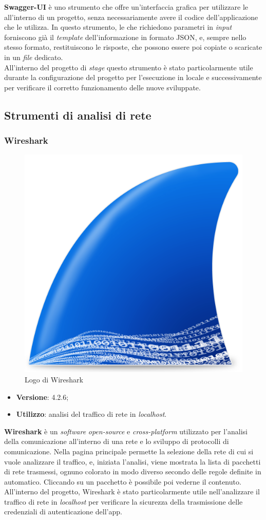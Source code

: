 \noindent \textbf{Swagger-UI} è uno strumento che offre un'interfaccia grafica per utilizzare le  all'interno di un progetto, senza necessariamente avere il codice dell'applicazione che le utilizza. In questo strumento, le  che richiedono parametri in \textit{input} forniscono già il \textit{template} dell'informazione in formato JSON, e, sempre nello stesso formato, restituiscono le risposte, che possono essere poi copiate o scaricate in un \textit{file} dedicato.\\
All'interno del progetto di \textit{stage} questo strumento è stato particolarmente utile durante la configurazione del progetto per l'esecuzione in locale e successivamente per verificare il corretto funzionamento delle nuove  sviluppate.


\subsection{Strumenti di analisi di rete}

\subsubsection{Wireshark}

\begin{figure}[H]
    \centering 
    \includegraphics[width=0.16\columnwidth]{images/loghi/wireshark.png} 
    \caption{Logo di Wireshark}
\end{figure}

\begin{itemize}
    \item \textbf{Versione}: 4.2.6;
    \item \textbf{Utilizzo}: analisi del traffico di rete in \textit{localhost}.
\end{itemize}

\noindent \textbf{Wireshark} è un \textit{software} \textit{open-source} e \textit{cross-platform} utilizzato per l'analisi della comunicazione all'interno di una rete e lo sviluppo di protocolli di comunicazione. Nella pagina principale permette la selezione della rete di cui si vuole analizzare il traffico, e, iniziata l'analisi, viene mostrata la lista di pacchetti di rete trasmessi, ognuno colorato in modo diverso secondo delle regole definite in automatico. Cliccando su un pacchetto è possibile poi vederne il contenuto.\\
All'interno del progetto, Wireshark è stato particolarmente utile nell'analizzare il traffico di rete in \textit{localhost} per verificare la sicurezza della trasmissione delle credenziali di autenticazione dell'app.


